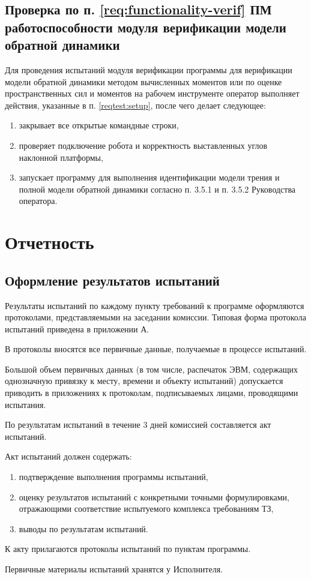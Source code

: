 \subsection{Проверка по п. \ref{req:functionality-verif} ПМ  работоспособности модуля верификации модели обратной динамики} \label{reqtest:functionality-verif}
Для проведения испытаний модуля верификации программы \productname для верификации модели обратной динамики методом вычисленных моментов
или по оценке пространственных сил и моментов на рабочем инструменте оператор выполняет действия, указанные в п. \ref{reqtest:setup}, после чего делает следующее:
\begin{enumerate}
  \item закрывает все открытые командные строки,
  \item проверяет подключение робота и корректность выставленных углов наклонной платформы,
  \item запускает программу для выполнения идентификации модели трения и полной модели обратной динамики согласно п. 3.5.1 и п. 3.5.2 Руководства оператора.
\end{enumerate}


\newpage
\section{Отчетность}

\subsection{Оформление результатов испытаний}
Результаты испытаний по каждому пункту требований к программе оформляются протоколами, представляемыми на заседании комиссии. Типовая форма протокола испытаний приведена в приложении А.

В протоколы вносятся все первичные данные, получаемые в процессе испытаний.

Большой объем первичных данных (в том числе, распечаток ЭВМ, содержащих однозначную привязку к месту, времени и объекту испытаний) допускается приводить в приложениях к протоколам, подписываемых лицами, проводящими испытания.

По результатам испытаний в течение 3 дней комиссией составляется акт испытаний.

Акт испытаний должен содержать:
\begin{enumerate}
    \item подтверждение выполнения программы испытаний,
    \item оценку результатов испытаний с конкретными точными формулировками, отражающими соответствие испытуемого комплекса требованиям ТЗ,
    \item выводы по результатам испытаний.
\end{enumerate}

К акту прилагаются протоколы испытаний по пунктам программы.

Первичные материалы испытаний хранятся у Исполнителя.

